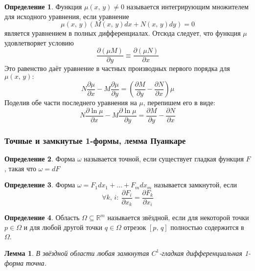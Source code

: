 \documentclass[a4paper,12pt]{article}
\theoremstyle{plain}
\newtheorem{lemma}{Лемма}[section]
\theoremstyle{definition}
\newtheorem{definition}{Определение}[section]
\theoremstyle{remark}
\begin{document}
\begin{definition}
	Функция $\mu(x,\,y) \neq 0$ называется интегрирующим множителем для исходного уравнения, если уравнение
	\[\mu(x,\,y)(M(x,\,y)dx + N(x,\,y)dy) = 0\]
	является уравнением в полных дифференциалах. Отсюда следует, что функция $\mu$ удовлетворяет условию
	\[\frac{\partial(\mu M)}{\partial y} \equiv \frac{\partial(\mu N)}{\partial x}\]
	Это равенство даёт уравнение в частных производных первого порядка для $\mu(x,\,y):$
	\[N\frac{\partial\mu}{\partial x} - M\frac{\partial\mu}{\partial y} = \left(\frac{\partial M}{\partial y} - \frac{\partial N}{\partial x}\right)\mu\]
	Поделив обе части последнего уравнения на $\mu$, перепишем его в виде:
	\[N\frac{\partial \ln\mu}{\partial x} - M\frac{\partial \ln\mu}{\partial y} = \frac{\partial M}{\partial y} - \frac{\partial N}{\partial x}\]
\end{definition}

\subsubsection*{Точные и замкнутые 1-формы, лемма Пуанкаре}
\begin{definition}
	Форма $\omega$ называется точной, если существует гладкая функция $F$, такая что $\omega = dF$
\end{definition}

\begin{definition}
	Форма $\omega = F_1dx_1 + \ldots + F_mdx_m$ называется замкнутой, если
	\[\forall k,\,i:\: \frac{\partial F_i}{\partial x_k} = \frac{\partial F_k}{\partial x_i}\]
\end{definition}

\begin{definition}
	Область $\Omega \subseteq \mathbb{R}^m$ называется звёздной, если для некоторой точки $p \in \Omega$ и для любой другой точки $q \in \Omega$ отрезок $[p,\, q]$ полностью содержится в $\Omega$.
\end{definition}

\begin{lemma}
	В звёздной области любая замкнутая $C^1$-гладкая дифференциальная 1-форма точна.
\end{lemma}
\end{document}
